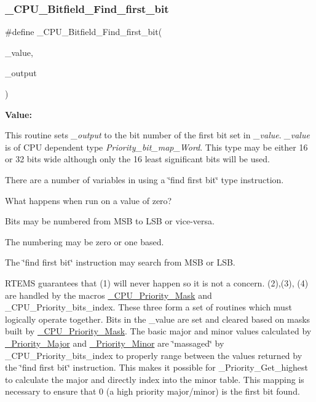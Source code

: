 \subsubsection{\texorpdfstring{\_CPU\_Bitfield\_Find\_first\_bit}{\_CPU\_Bitfield\_Find\_first\_bit}}
{\footnotesize\ttfamily \#define \+\_\+\+C\+P\+U\+\_\+\+Bitfield\+\_\+\+Find\+\_\+first\+\_\+bit(\begin{DoxyParamCaption}\item[{}]{\+\_\+value,  }\item[{}]{\+\_\+output }\end{DoxyParamCaption})}

{\bfseries Value\+:}
\begin{DoxyCode}{0}
\DoxyCodeLine{\{ \(\backslash\)}
\DoxyCodeLine{  \}}

\end{DoxyCode}
This routine sets {\itshape \+\_\+output} to the bit number of the first bit set in {\itshape \+\_\+value}. {\itshape \+\_\+value} is of C\+PU dependent type {\itshape Priority\+\_\+bit\+\_\+map\+\_\+\+Word}. This type may be either 16 or 32 bits wide although only the 16 least significant bits will be used.

There are a number of variables in using a \char`\"{}find first bit\char`\"{} type instruction.


\begin{DoxyEnumerate}
\item What happens when run on a value of zero?
\item Bits may be numbered from M\+SB to L\+SB or vice-\/versa.
\item The numbering may be zero or one based.
\item The \char`\"{}find first bit\char`\"{} instruction may search from M\+SB or L\+SB.
\end{DoxyEnumerate}

R\+T\+E\+MS guarantees that (1) will never happen so it is not a concern. (2),(3), (4) are handled by the macros \mbox{\hyperlink{no__cpu_2include_2rtems_2score_2cpu_8h_ab2b14ff6bbccff7e0a99f55c4c8b8e87}{\+\_\+\+C\+P\+U\+\_\+\+Priority\+\_\+\+Mask}} and \+\_\+\+C\+P\+U\+\_\+\+Priority\+\_\+bits\+\_\+index. These three form a set of routines which must logically operate together. Bits in the \+\_\+value are set and cleared based on masks built by \mbox{\hyperlink{no__cpu_2include_2rtems_2score_2cpu_8h_ab2b14ff6bbccff7e0a99f55c4c8b8e87}{\+\_\+\+C\+P\+U\+\_\+\+Priority\+\_\+\+Mask}}. The basic major and minor values calculated by \mbox{\hyperlink{group__RTEMSScorePriority_ga1e9fd447bd6120ec504a82d5e4f4dc24}{\+\_\+\+Priority\+\_\+\+Major}} and \mbox{\hyperlink{group__RTEMSScorePriority_gaaf7dd3dde9aa776f2c16fee4c1e572ed}{\+\_\+\+Priority\+\_\+\+Minor}} are \char`\"{}massaged\char`\"{} by \+\_\+\+C\+P\+U\+\_\+\+Priority\+\_\+bits\+\_\+index to properly range between the values returned by the \char`\"{}find first bit\char`\"{} instruction. This makes it possible for \+\_\+\+Priority\+\_\+\+Get\+\_\+highest to calculate the major and directly index into the minor table. This mapping is necessary to ensure that 0 (a high priority major/minor) is the first bit found.


